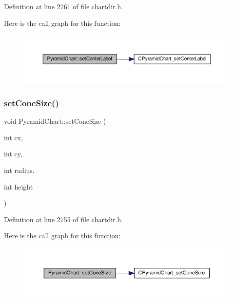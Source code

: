 Definition at line 2761 of file chartdir.\+h.

Here is the call graph for this function\+:
\nopagebreak
\begin{figure}[H]
\begin{center}
\leavevmode
\includegraphics[width=350pt]{class_pyramid_chart_a90421ce47f83d9ae8ef001196e0d1712_cgraph}
\end{center}
\end{figure}
\mbox{\label{class_pyramid_chart_ae46555e161427e9130b7996b38df11a2}} 
\subsubsection{\texorpdfstring{set\+Cone\+Size()}{setConeSize()}}
{\footnotesize\ttfamily void Pyramid\+Chart\+::set\+Cone\+Size (\begin{DoxyParamCaption}\item[{int}]{cx,  }\item[{int}]{cy,  }\item[{int}]{radius,  }\item[{int}]{height }\end{DoxyParamCaption})\hspace{0.3cm}{\ttfamily [inline]}}



Definition at line 2755 of file chartdir.\+h.

Here is the call graph for this function\+:
\nopagebreak
\begin{figure}[H]
\begin{center}
\leavevmode
\includegraphics[width=350pt]{class_pyramid_chart_ae46555e161427e9130b7996b38df11a2_cgraph}
\end{center}
\end{figure}
\mbox{\label{class_pyramid_chart_aac92f3377d6e2a7241480a16ff775a5d}} 
